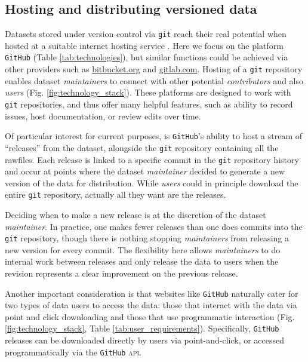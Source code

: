 \documentclass[a4paper,11pt]{article}
\begin{document}
\subsection{Hosting and distributing versioned data}

Datasets stored under version control via \texttt{git} reach their real potential when hosted at a suitable internet hosting service \citep{Ram-2013,Perkel-2016}. Here we focus on the platform \texttt{GitHub} (Table \ref{tab:technologies}), but similar functions could be achieved via other providers such as \href{http://bitbucket.org}{bitbucket.org} and \href{http://gitlab.com}{gitlab.com}. Hosting of a \texttt{git} repository enables dataset \emph{maintainers} to connect with other potential \emph{contributors} and also \emph{users} (Fig. \ref{fig:technology_stack}). These platforms are designed to work with \texttt{git} repositories, and thus offer many helpful features, such as ability to record issues, host documentation, or review edits over time.

Of particular interest for current purposes, is \texttt{GitHub}'s ability to host a stream of ``releases'' from the dataset, alongside the \texttt{git} repository containing all the rawfiles. Each release is linked to a specific commit in the \texttt{git} repository history and occur at points where the dataset \emph{maintainer} decided to generate a new version of the data for distribution. While \emph{users} could in principle download the entire \texttt{git} repository, actually all they want are the releases.

Deciding when to make a new release is at the discretion of the dataset \emph{maintainer}. In practice, one makes fewer releases than one does commits into the \texttt{git} repository, though there is nothing stopping \emph{maintainers} from releasing a new version for every commit. The flexibility here allows \emph{maintainers} to do internal work between releases and only release the data to users when the revision represents a clear improvement on the previous release.

Another important consideration is that websites like \texttt{GitHub} naturally cater for two types of data users to access the data: those that interact with the data via point and click downloading and those that use programmatic interaction (Fig. \ref{fig:technology_stack}, Table \ref{tab:user_requirements}). Specifically, \texttt{GitHub} releases can be downloaded directly by users via point-and-click, or accessed programmatically via the \texttt{GitHub} \textsc{api}.
\end{document}
